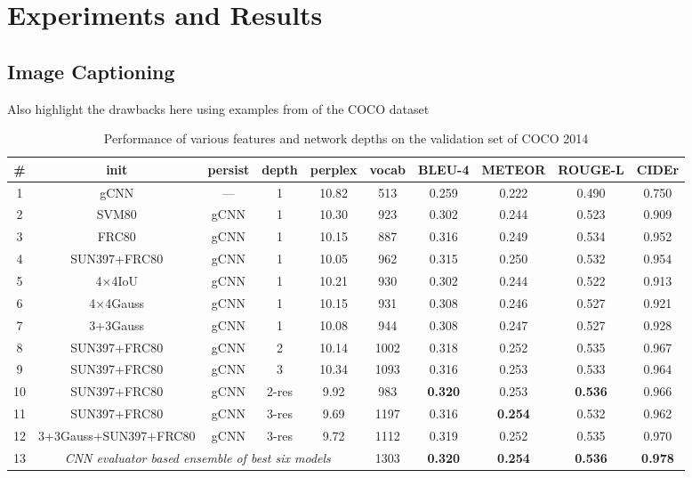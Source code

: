 \chapter{Experiments and Results}
\label{chapter:results}

\section{Image Captioning}
Also highlight the drawbacks here using examples from of the COCO dataset

\begin{table}[htp]
  \caption{Performance of various features and 
    network depths on the validation set of COCO 2014}
  \newcommand{\modpar}[4]{%
    \multirow{2}{*}{\emph{#1}} & \multirow{2}{*}{#2} & \multirow{2}{*}{#3}
    & \multirow{2}{*}{#4}}
  \centering
  \newcommand{\bs}{\small\bf}
  \begin{tabular}{||c|c|c|c|c|c|c|c|c|c|}
    \hline\hline
    \bf\# &\bf init &\bf persist &\bf depth &\bf perplex &\bf vocab &\bs BLEU-4 &\bs METEOR &\bs ROUGE-L &\bs CIDEr \\\hline\hline
    1 & gCNN                 &  --- & 1  & 10.82 & 513  & 0.259 & 0.222 & 0.490 & 0.750 \\
    2 & SVM80                & gCNN & 1  & 10.30 & 923  & 0.302 & 0.244 & 0.523 & 0.909 \\
    3 & FRC80                & gCNN & 1  & 10.15 & 887  & 0.316 & 0.249 & 0.534 & 0.952 \\
    4 & SUN397+FRC80         & gCNN & 1  & 10.05 & 962  & 0.315 & 0.250 & 0.532 & 0.954 \\\hline
    5 & 4$\times$4IoU        & gCNN & 1  & 10.21 & 930  & 0.302 & 0.244 & 0.522 & 0.913 \\
    6 & 4$\times$4Gauss      & gCNN & 1  & 10.15 & 931  & 0.308 & 0.246 & 0.527 & 0.921 \\
    7 & 3+3Gauss             & gCNN & 1  & 10.08 & 944  & 0.308 & 0.247 & 0.527 & 0.928 \\\hline
    8 & SUN397+FRC80         & gCNN & 2  & 10.14 & 1002 & 0.318 & 0.252 & 0.535 & 0.967 \\
    9 & SUN397+FRC80         & gCNN & 3  & 10.34 & 1093 & 0.316 & 0.253 & 0.533 & 0.964 \\
    10& SUN397+FRC80         & gCNN &2-res& 9.92 & 983  &\bf0.320& 0.253 &\bf0.536& 0.966 \\
    11& SUN397+FRC80         & gCNN &3-res& 9.69 & 1197 & 0.316 &\bf0.254& 0.532& 0.962 \\\hline
    12&3+3Gauss+SUN397+FRC80 & gCNN &3-res& 9.72 & 1112 & 0.319 & 0.252 & 0.535 & 0.970 \\\hline
    13& \multicolumn{4}{c|}{\em CNN evaluator based ensemble of best six models}    
                                                 & 1303 &\bf0.320&\bf0.254 &\bf0.536 &\bf0.978 \\\hline
    \hline
  \end{tabular}
  \label{tab:resultsVal}
\end{table}

